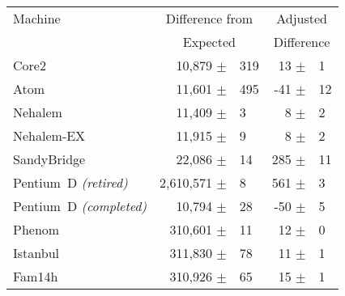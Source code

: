 %

\begin{tabular}{|l||rl|rl|}

\hline
Machine   & \multicolumn{2}{c|}{Difference from} & \multicolumn{2}{c|}{Adjusted} \\
          & \multicolumn{2}{c|}{Expected} & \multicolumn{2}{c|}{Difference} \\
\hline
\hline

Core2          &    10,879 $\pm$ & 319     &     13 $\pm$ & 1  \\
\hline
Atom           &    11,601 $\pm$ & 495    &     -41 $\pm$ & 12 \\
\hline
Nehalem        &    11,409 $\pm$ & 3      &       8 $\pm$ & 2  \\
\hline
Nehalem-EX     &    11,915 $\pm$ & 9      &       8 $\pm$ & 2  \\
\hline
SandyBridge    &    22,086 $\pm$ & 14     &     285 $\pm$ & 11  \\
\hline
Pentium~D {\em \footnotesize (retired)} &   2,610,571 $\pm$ & 8      &     561 $\pm$ & 3 \\
\hline
Pentium~D {\em \footnotesize (completed)} &    10,794 $\pm$ & 28     &     -50 $\pm$ & 5  \\
\hline
Phenom         &   310,601 $\pm$ & 11     &      12 $\pm$ & 0  \\
\hline
Istanbul       &   311,830 $\pm$ & 78     &      11 $\pm$ & 1  \\
\hline
Fam14h         &   310,926 $\pm$ & 65     &      15 $\pm$ & 1  \\
\hline

\end{tabular}

